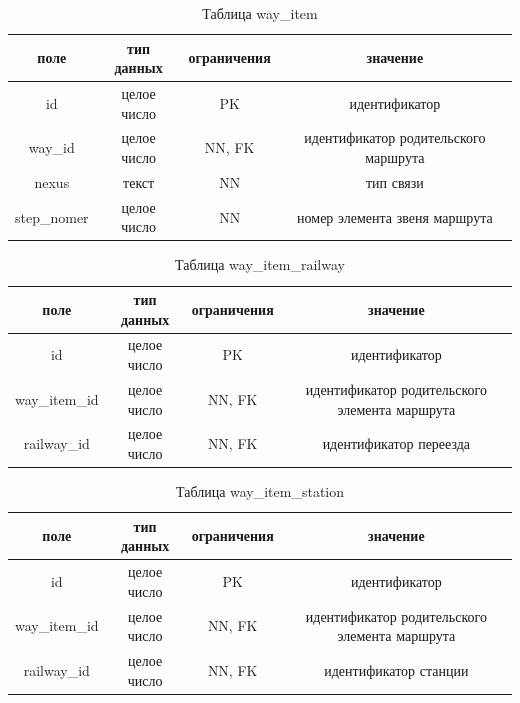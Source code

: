 \begin{table}[H]
    \begin{center}
        \caption{Таблица way\_item}
        \label{tbl:way_item}
        \begin{tabular}{|c|c|c|c|}
            \hline
            поле & тип данных & ограничения & значение \\
            \hline
            id & целое число & PK & идентификатор \\
            \hline
            way\_id & целое число & NN, FK & идентификатор родительского маршрута \\
            \hline
            nexus & текст & NN & тип связи \\
            \hline
            step\_nomer & целое число & NN & номер элемента звеня маршрута \\
            \hline
        \end{tabular}
    \end{center}    
\end{table}

\begin{table}[H]
    \begin{center}
        \caption{Таблица way\_item\_railway}
        \label{tbl:way_item_railway}
        \begin{tabular}{|c|c|c|c|}
            \hline
            поле & тип данных & ограничения & значение \\
            \hline
            id & целое число & PK & идентификатор \\
            \hline
            way\_item\_id & целое число & NN, FK & идентификатор родительского элемента маршрута \\
            \hline
            railway\_id & целое число & NN, FK & идентификатор переезда \\
            \hline
        \end{tabular}
    \end{center}    
\end{table}

\begin{table}[H]
    \begin{center}
        \caption{Таблица way\_item\_station}
        \label{tbl:way_item_station}
        \begin{tabular}{|c|c|c|c|}
            \hline
            поле & тип данных & ограничения & значение \\
            \hline
            id & целое число & PK & идентификатор \\
            \hline
            way\_item\_id & целое число & NN, FK & идентификатор родительского элемента маршрута \\
            \hline
            railway\_id & целое число & NN, FK & идентификатор станции \\
            \hline
        \end{tabular}
    \end{center}    
\end{table}

